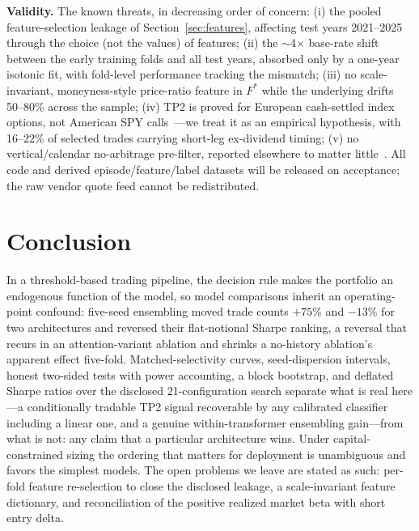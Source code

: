 \documentclass[sigconf,review]{acmart}
\begin{document}
\noindent\textbf{Validity.} The known threats, in decreasing order of concern: (i) the pooled feature-selection leakage of Section~\ref{sec:features}, affecting test years 2021--2025 through the choice (not the values) of features; (ii) the $\sim$4$\times$ base-rate shift between the early training folds and all test years, absorbed only by a one-year isotonic fit, with fold-level performance tracking the mismatch; (iii) no scale-invariant, moneyness-style price-ratio feature in $F^{\ast}$ while the underlying drifts 50--80\% across the sample; (iv) TP2 is proved for European cash-settled index options, not American SPY calls~\cite{glasserman2026tp2theory,cosma2020earlyexercise}---we treat it as an empirical hypothesis, with 16--22\% of selected trades carrying short-leg ex-dividend timing; (v) no vertical/calendar no-arbitrage pre-filter, reported elsewhere to matter little~\cite{glasserman2025tp2}. All code and derived episode/feature/label datasets will be released on acceptance; the raw vendor quote feed cannot be redistributed.

\section{Conclusion}
In a threshold-based trading pipeline, the decision rule makes the portfolio an endogenous function of the model, so model comparisons inherit an operating-point confound: five-seed ensembling moved trade counts $+75\%$ and $-13\%$ for two architectures and reversed their flat-notional Sharpe ranking, a reversal that recurs in an attention-variant ablation and shrinks a no-history ablation's apparent effect five-fold. Matched-selectivity curves, seed-dispersion intervals, honest two-sided tests with power accounting, a block bootstrap, and deflated Sharpe ratios over the disclosed 21-configuration search separate what is real here---a conditionally tradable TP2 signal recoverable by any calibrated classifier including a linear one, and a genuine within-transformer ensembling gain---from what is not: any claim that a particular architecture wins. Under capital-constrained sizing the ordering that matters for deployment is unambiguous and favors the simplest models. The open problems we leave are stated as such: per-fold feature re-selection to close the disclosed leakage, a scale-invariant feature dictionary, and reconciliation of the positive realized market beta with short entry delta.
\end{document}

